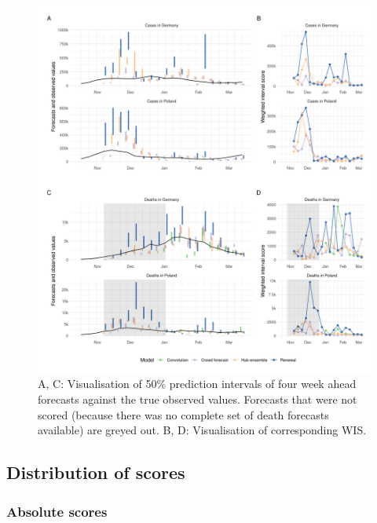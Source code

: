 \documentclass[
]{article}
\begin{document}
\begin{figure}[H]
\includegraphics[width=1\linewidth,]{../analysis/plots/figure-forecasts-4} \caption{A, C: Visualisation of 50\% prediction intervals of four week ahead forecasts against the true observed values. Forecasts that were not scored (because there was no complete set of death forecasts available) are greyed out. B, D: Visualisation of corresponding WIS.}\label{fig:forecasts-and-truth-4}
\end{figure}

\clearpage

\hypertarget{distribution-of-scores}{%
\subsection{Distribution of scores}\label{distribution-of-scores}}

\hypertarget{absolute-scores}{%
\subsubsection{Absolute scores}\label{absolute-scores}}
\end{document}
